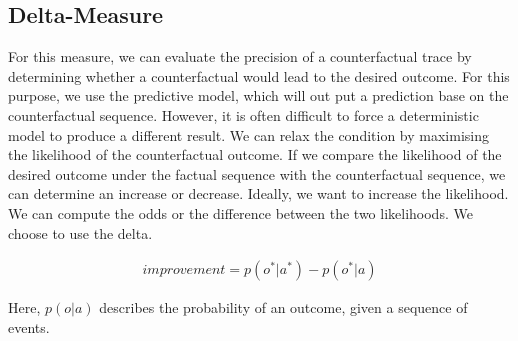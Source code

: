 \documentclass[./../../paper.tex]{subfiles}
\begin{document}
\subsection{Delta-Measure}
For this measure, we can evaluate the precision of a counterfactual trace by determining whether a counterfactual would lead to the desired outcome. For this purpose, we use the predictive model, which will out put a prediction base on the counterfactual sequence. However, it is often difficult to force a deterministic model to produce a different result. We can relax the condition by maximising the likelihood of the counterfactual outcome. If we compare the likelihood of the desired outcome under the factual sequence with the counterfactual sequence, we can determine an increase or decrease. Ideally, we want to increase the likelihood. We can compute the odds or the difference between the two likelihoods. We choose to use the delta.

\begin{align}
    \label{eq:likelihood_measure}
    improvement = p(o^*|a^*)-p(o^*|a)
\end{align}

\noindent Here, $p(o|a)$ describes the probability of an outcome, given a sequence of events.
\end{document}
